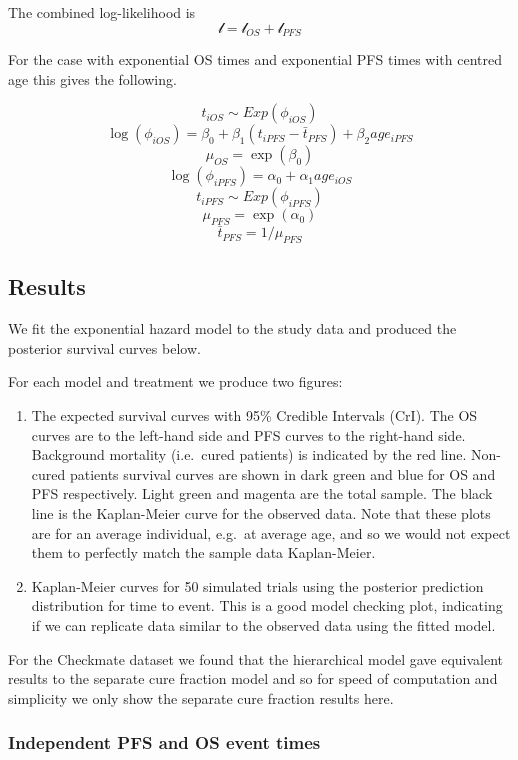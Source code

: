 \documentclass[
]{article}
\begin{document}
The combined log-likelihood is \[
\mathcal{l} = \mathcal{l}_{OS} + \mathcal{l}_{PFS}
\]

For the case with exponential OS times and exponential PFS times with
centred age this gives the following.

\[
t_{iOS} \sim Exp(\phi_{iOS})
\] \[
\log(\phi_{iOS}) = \beta_0 + \beta_1 (t_{iPFS} - \bar{t}_{PFS}) + \beta_2 age_{iPFS}
\] \[
\mu_{OS} = \exp(\beta_0)
\] \[
\log(\phi_{iPFS}) = \alpha_0 + \alpha_1 age_{iOS}
\] \[
t_{iPFS} \sim Exp(\phi_{iPFS})
\] \[
\mu_{PFS} = \exp(\alpha_0)
\] \[
\bar{t}_{PFS} = 1/\mu_{PFS} 
\]

\hypertarget{results}{%
\subsection{Results}\label{results}}

We fit the exponential hazard model to the study data and produced the
posterior survival curves below.

For each model and treatment we produce two figures:

\begin{enumerate}
\def\labelenumi{\arabic{enumi}.}
\item
  The expected survival curves with 95\% Credible Intervals (CrI). The
  OS curves are to the left-hand side and PFS curves to the right-hand
  side. Background mortality (i.e.~cured patients) is indicated by the
  red line. Non-cured patients survival curves are shown in dark green
  and blue for OS and PFS respectively. Light green and magenta are the
  total sample. The black line is the Kaplan-Meier curve for the
  observed data. Note that these plots are for an average individual,
  e.g.~at average age, and so we would not expect them to perfectly
  match the sample data Kaplan-Meier.
\item
  Kaplan-Meier curves for 50 simulated trials using the posterior
  prediction distribution for time to event. This is a good model
  checking plot, indicating if we can replicate data similar to the
  observed data using the fitted model.
\end{enumerate}

For the Checkmate dataset we found that the hierarchical model gave
equivalent results to the separate cure fraction model and so for speed
of computation and simplicity we only show the separate cure fraction
results here.

\hypertarget{independent-pfs-and-os-event-times}{%
\subsubsection{Independent PFS and OS event
times}\label{independent-pfs-and-os-event-times}}
\end{document}
